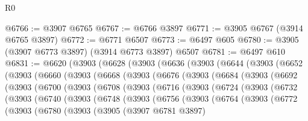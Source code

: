\begin{lexlean}{R0}
\begin{coremodule}
@6766 := @3907 @6765
@6767 := @6766 @3897
@6771 := @3905 @6767 (@3914 @6765 @3897)
@6772 := @6771 @6507
@6773 := @6497 @605
@6780 := @3905 (@3907 @6773 @3897) (@3914 @6773 @3897) @6507
@6781 := @6497 @610
@6831 := @6620
    (@3903
      (@6628
        (@3903
          (@6636
            (@3903
              (@6644
                (@3903
                  (@6652
                    (@3903
                      (@6660
                        (@3903
                          (@6668
                            (@3903
                              (@6676
                                (@3903
                                  (@6684
                                    (@3903
                                      (@6692
                                        (@3903
                                          (@6700
                                            (@3903
                                              (@6708
                                                (@3903
                                                  (@6716
                                                    (@3903
                                                      (@6724
                                                        (@3903
                                                          (@6732
                                                            (@3903
                                                              (@6740
                                                                (@3903
                                                                  (@6748
                                                                    (@3903
                                                                      (@6756
                                                                        (@3903
                                                                          (@6764
                                                                            (@3903
                                                                              (@6772
                                                                                (@3903
                                                                                  (@6780
                                                                                    (@3903
                                                                                      (@3905
                                                                                        (@3907
                                                                                          @6781
                                                                                          @3897)

\end{coremodule}
\end{lexlean}
